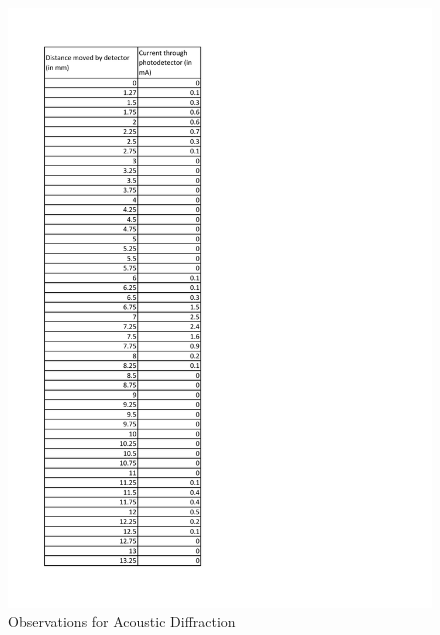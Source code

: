 	\begin{figure}[bth]
		\begin{center}
			\includegraphics[width=1.3\linewidth]{gfx/e2_obs}
		\end{center}
		\caption[Observations]{Observations for Acoustic Diffraction}
	\label{e2_obs}
	\end{figure}

